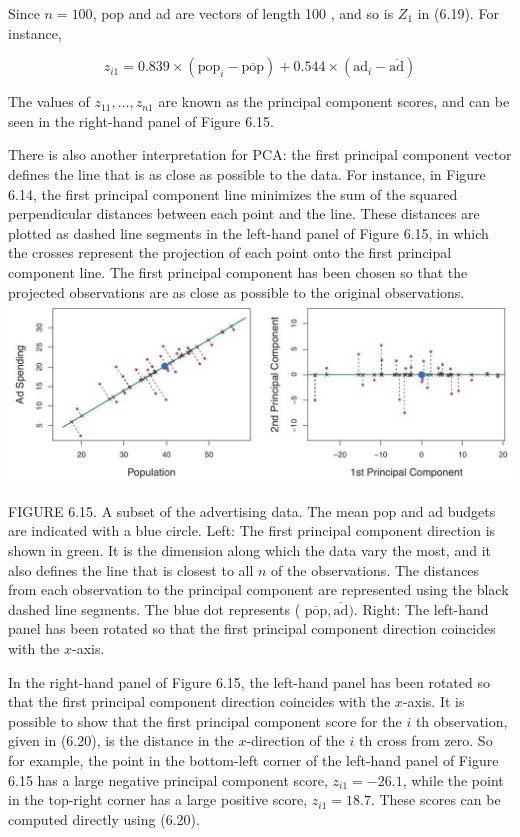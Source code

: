 \documentclass[10pt]{article}
\begin{document}
Since $n=100$, pop and ad are vectors of length 100 , and so is $Z_{1}$ in (6.19). For instance,


\begin{equation*}
z_{i 1}=0.839 \times\left(\mathrm{pop}_{i}-\overline{\mathrm{pop}}\right)+0.544 \times\left(\mathrm{ad}_{i}-\overline{\mathrm{ad}}\right) \tag{6.20}
\end{equation*}


The values of $z_{11}, \ldots, z_{n 1}$ are known as the principal component scores, and can be seen in the right-hand panel of Figure 6.15.

There is also another interpretation for PCA: the first principal component vector defines the line that is as close as possible to the data. For instance, in Figure 6.14, the first principal component line minimizes the sum of the squared perpendicular distances between each point and the line. These distances are plotted as dashed line segments in the left-hand panel of Figure 6.15, in which the crosses represent the projection of each point onto the first principal component line. The first principal component has been chosen so that the projected observations are as close as possible to the original observations.\\
\includegraphics[max width=\textwidth, center]{2025_05_05_efe77898333945044de4g-247}

FIGURE 6.15. A subset of the advertising data. The mean pop and ad budgets are indicated with a blue circle. Left: The first principal component direction is shown in green. It is the dimension along which the data vary the most, and it also defines the line that is closest to all $n$ of the observations. The distances from each observation to the principal component are represented using the black dashed line segments. The blue dot represents ( $\overline{\mathrm{pop}}, \overline{\mathrm{ad}})$. Right: The left-hand panel has been rotated so that the first principal component direction coincides with the $x$-axis.

In the right-hand panel of Figure 6.15, the left-hand panel has been rotated so that the first principal component direction coincides with the $x$-axis. It is possible to show that the first principal component score for the $i$ th observation, given in (6.20), is the distance in the $x$-direction of the $i$ th cross from zero. So for example, the point in the bottom-left corner of the left-hand panel of Figure 6.15 has a large negative principal component score, $z_{i 1}=-26.1$, while the point in the top-right corner has a large positive score, $z_{i 1}=18.7$. These scores can be computed directly using (6.20).
\end{document}
